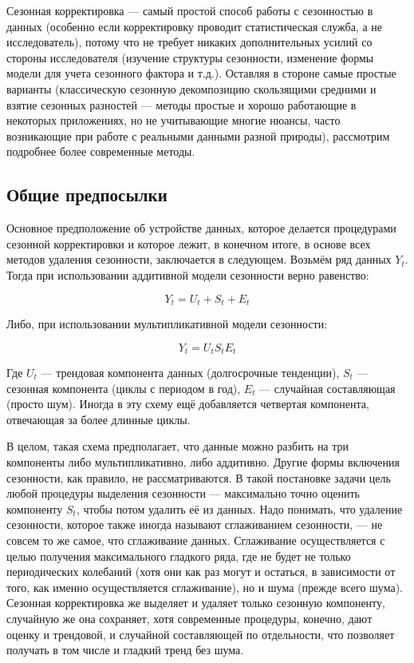 \documentclass[final,pdftex]{../../template/epsilonj}\usepackage[]{graphicx}\usepackage[]{color}
\begin{document}
Сезонная корректировка --- самый простой способ работы с сезонностью в данных (особенно если корректировку проводит статистическая служба, а не исследователь), потому что не требует никаких дополнительных усилий со стороны исследователя (изучение структуры сезонности, изменение формы модели для учета сезонного фактора и т.д.). Оставляя в стороне самые простые варианты (классическую сезонную декомпозицию скользящими средними и взятие сезонных разностей --- методы простые и хорошо работающие в некоторых приложениях, но не учитывающие многие нюансы, часто возникающие при работе с реальными данными разной природы), рассмотрим подробнее более современные методы. 

\subsection{Общие предпосылки}

Основное предположение об устройстве данных, которое делается процедурами сезонной корректировки и которое лежит, в конечном итоге, в основе всех методов удаления сезонности, заключается в следующем. Возьмём ряд данных $Y_t$. Тогда при использовании аддитивной модели сезонности верно равенство:

\[
Y_t = U_t + S_t + E_t
\]

Либо, при использовании мультипликативной модели сезонности:

\[ 
Y_t = U_t S_t E_t
\]

Где $U_t$ --- трендовая компонента данных (долгосрочные тенденции), $S_t$ --- сезонная компонента (циклы с периодом в год), $E_t$ --- случайная составляющая (просто шум). Иногда в эту схему ещё добавляется четвертая компонента, отвечающая за более длинные циклы. 

В целом, такая схема предполагает, что данные можно разбить на три компоненты либо мультипликативно, либо аддитивно. Другие формы включения сезонности, как правило, не рассматриваются. В такой постановке задачи цель любой процедуры выделения сезонности --- максимально точно оценить компоненту $S_t$, чтобы потом удалить её из данных. Надо понимать, что удаление сезонности, которое также иногда называют сглаживанием сезонности, --- не совсем то же самое, что сглаживание данных. Сглаживание осуществляется с целью получения максимального гладкого ряда, где не будет не только периодических колебаний (хотя они как раз могут и остаться, в зависимости от того, как именно осуществляется сглаживание), но и шума (прежде всего шума). Сезонная корректировка же выделяет и удаляет только сезонную компоненту, случайную же она сохраняет, хотя современные процедуры, конечно, дают оценку и трендовой, и случайной составляющей по отдельности, что позволяет получать в том числе и гладкий тренд без шума. 
\end{document}
